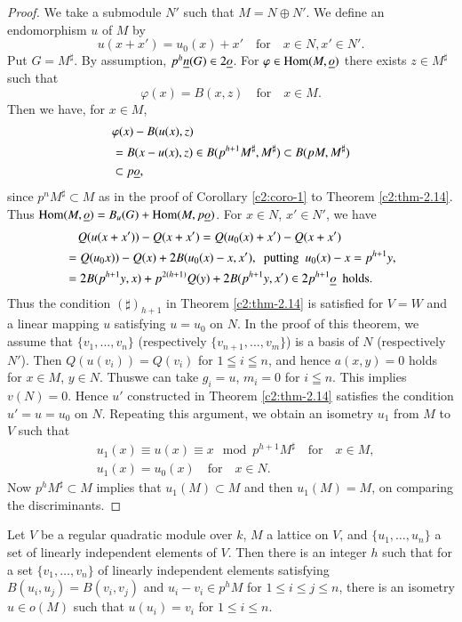 \begin{proof}
We take a submodule $N'$ such that $M=N\oplus N'$. We define an
endomorphism $u$ of $M$ by
$$
u(x+x')=u_{0}(x)+x'\quad\text{for}\quad x\in N, x'\in N'.
$$
Put $G=M^{\sharp}$. By assumption, $p^{h}\underline{n}(G)\in 2\underline{o}$. For
$\varphi\in \operatorname{Hom}(M,\underline{o})$ there exists $z\in M^{\sharp}$ such that
$$
\varphi(x)=B(x,z)\quad\text{for}\quad x\in M.
$$
Then we have, for $x\in M$,
\begin{align*}
& \varphi(x)-B(u(x),z)\\
&= B(x-u(x),z)\in B(p^{h+1}M^{\sharp},M^{\sharp})\subset
  B(pM,M^{\sharp})\\
&\subset p\underline{o},
\end{align*}
since $p^{n}M^{\sharp}\subset M$ as in the proof of Corollary
\ref{c2:coro-1} to Theorem \ref{c2:thm-2.14}. Thus
$\operatorname{Hom}(M,\underline{o})=B_{u}(G)+\operatorname{Hom}(M,p\underline{o})$. For $x\in N$, $x'\in N'$,
we have
\begin{align*}
&\quad Q(u(x+x'))-Q(x+x')=Q(u_{0}(x)+x')-Q(x+x')\\
&=Q(u_{0}x))-Q(x)+2B(u_{0}(x)-x,x'),\text{ \ putting \ }
  u_{0}(x)-x=p^{h+1}y,\\
&= 2B(p^{h+1}y,x)+p^{2(h+1)}Q(y)+2B(p^{h+1}y, x')\in
  2p^{h+1}\underline{o}\text{ \ holds.}
\end{align*}
Thus the condition $(\sharp)_{h+1}$ in Theorem \ref{c2:thm-2.14} is
satisfied for $V=W$ and a linear mapping $u$ satisfying $u=u_{0}$ on
$N$. In the proof of this theorem, we assume that
$\{v_{1},\ldots,v_{n}\}$ (respectively $\{v_{n+1},\ldots,v_{m}\}$) is
a basis of $N$ (respectively $N'$). Then $Q(u(v_{i}))=Q(v_{i})$ for
$1\leqq i\leqq n$, and hence $a(x,y)=0$ holds for $x\in M$, $y\in
N$. Thus\pageoriginale we can take $g_{i}=u$, $m_{i}=0$ for $i\leqq
n$. This implies $v(N)=0$. Hence $u'$ constructed in Theorem
\ref{c2:thm-2.14} satisfies the condition $u'=u=u_{0}$ on $N$. Repeating
this argument, we obtain an isometry $u_{1}$ from $M$ to $V$ such that
\begin{align*}
& u_{1}(x)\equiv u(x)\equiv x\mod
  p^{h+1}M^{\sharp}\quad\text{for}\quad x\in M,\\
& u_{1}(x)=u_{0}(x)\quad\text{for}\quad x\in N.
\end{align*}
Now $p^{h}M^{\sharp}\subset M$ implies that $u_{1}(M)\subset M$ and
then $u_{1}(M)=M$, on comparing the discriminants.
\end{proof}

\begin{cor}\label{c2:cor-3}
Let $V$ be a regular quadratic module over $k$, $M$ a lattice on $V$,
and $\{u_{1},\ldots,u_{n}\}$ a set of linearly independent elements of
$V$. Then there is an integer $h$ such that for a set
$\{v_{1},\ldots,v_{n}\}$ of linearly independent elements satisfying
$B(u_{i},u_{j})=B(v_{i},v_{j})$ and $u_{i}-v_{i}\in p^{h}M$ for $1\leq
i\leq j\leq n$, there is an isometry $u\in o(M)$ such that
$u(u_{i})=v_{i}$ for $1\leq i\leq n$. 
\end{cor}

